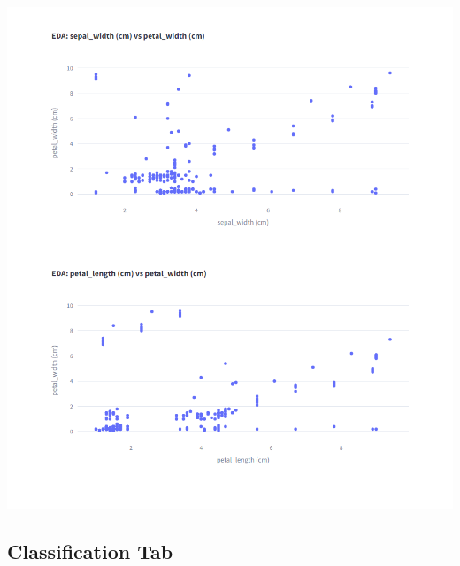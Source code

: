 \documentclass{article}
\begin{document}
\includegraphics[width=1.0\linewidth]{tab0_eda5-6.png}

\subsection{Classification Tab}
\end{document}
